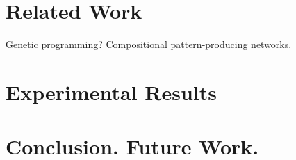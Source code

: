 \documentclass[12pt]{article}
\begin{document}
\section*{Related Work}

Genetic programming?
Compositional pattern-producing networks.



\section{Experimental Results}
\label{results}

\section{Conclusion. Future Work.}
\label{conclusion}

\renewcommand{\refname}{\section{References}}


\end{document}
